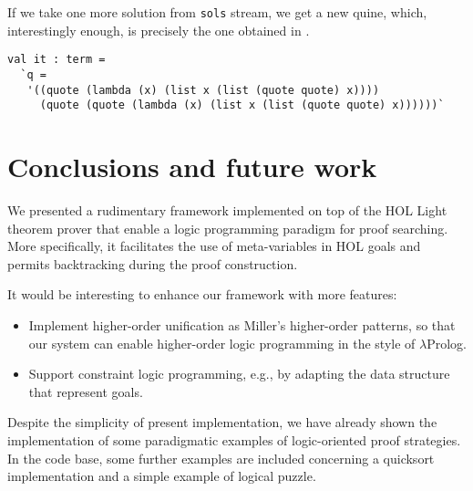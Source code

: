 If we take one more solution from \verb|sols| stream, we get a new
quine, which, interestingly enough, is precisely the one obtained in
\cite{Byrd:2012:MLU:2661103.2661105}.
\begin{verbatim}
val it : term =
  `q =
   '((quote (lambda (x) (list x (list (quote quote) x))))
     (quote (quote (lambda (x) (list x (list (quote quote) x))))))`
\end{verbatim}

\section{Conclusions and future work}
\label{sec:conclusions}

We presented a rudimentary framework implemented on top of the HOL
Light theorem prover that enable a logic programming paradigm for
proof searching.  More specifically, it facilitates the use of
meta-variables in HOL goals and permits backtracking during the proof
construction.

It would be interesting to enhance our framework with more features:
\begin{itemize}
\item Implement higher-order unification as Miller's higher-order
  patterns, so that our system can enable higher-order logic
  programming in the style of $\lambda$Prolog.
\item Support constraint logic programming, e.g., by adapting the data
  structure that represent goals.
\end{itemize}

Despite the simplicity of present implementation, we have already
shown the implementation of some paradigmatic examples of
logic-oriented proof strategies.  In the code base, some further
examples are included concerning a quicksort implementation and a
simple example of logical puzzle.

